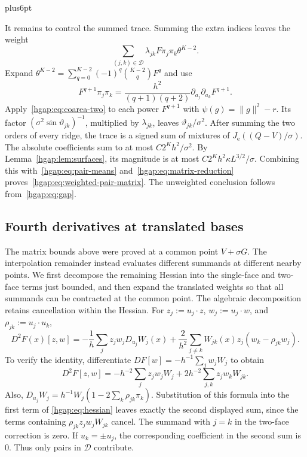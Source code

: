 \documentclass[11pt,letterpaper,twoside,leqno]{article}
\makeatletter
\theoremstyle{bookplain}
\theoremstyle{bookremark}
\renewenvironment{proof}[1][\proofname]{\par
  \pushQED{\qed}\normalfont\topsep6pt plus6pt\relax
  \trivlist\item[\hskip\labelsep\bfseries #1\@addpunct{.}]\ignorespaces
}{\popQED\endtrivlist\@endpefalse}
\newcommand{\cD}{\mathcal D}
\makeatother
\begin{document}
\begin{proof}
It remains to control the summed trace. Summing the extra indices
leaves the weight
\[
 \sum_{(j,k)\in\cD}\lambda_{jk}F\pi_j\pi_k\theta^{K-2}.
\]
Expand
$\theta^{K-2}=\sum_{q=0}^{K-2}(-1)^q\binom{K-2}{q}F^q$ and use
\[
 F^{q+1}\pi_j\pi_k
 =\frac{h^2}{(q+1)(q+2)}
       \partial_{a_j}\partial_{a_k}F^{q+1}.
\]
Apply~\eqref{hgap:eq:coarea-two} to each power $F^{q+1}$ with
$\psi(g)=\|g\|^2-r$. Its factor
$(\sigma^2\sin\vartheta_{jk})^{-1}$, multiplied by
$\lambda_{jk}$, leaves $\vartheta_{jk}/\sigma^2$.
After summing the two orders of every ridge, the trace is a signed
sum of mixtures of $J_{\mathrm e}((Q-V)/\sigma)$.
The absolute coefficients sum to at most $C2^Kh^2/\sigma^2$.
By Lemma~\ref{hgap:lem:surfaces}, its magnitude is at most
$C2^K h^2\kappa L^{3/2}/\sigma$. Combining this with~\eqref{hgap:eq:pair-means}
and~\eqref{hgap:eq:matrix-reduction} proves~\eqref{hgap:eq:weighted-pair-matrix}.
The unweighted conclusion follows from~\eqref{hgap:eq:gap}.
\end{proof}

\subsection{Fourth derivatives at translated bases}\label{hgap:sec:translated}

The matrix bounds above were proved at a common point $V+\sigma G$.
The interpolation remainder instead evaluates different summands at
different nearby points. We first decompose the remaining Hessian
into the single-face and two-face terms just bounded, and then expand
the translated weights so that all summands can be contracted at the
common point.
The algebraic decomposition retains cancellation within the Hessian.
For $z_j:=u_j\cdot z$, $w_j:=u_j\cdot w$, and
$\rho_{jk}:=u_j\cdot u_k$,
\begin{equation}
 D^2F(x)[z,w]
 =-\frac1h\sum_j z_jw_jD_{u_j}W_j(x)
 +\frac2{h^2}\sum_{j\ne k}W_{jk}(x)z_j(w_k-\rho_{jk}w_j).
 \label{hgap:eq:hessian}
\end{equation}
To verify the identity, differentiate $D F[w]=-h^{-1}\sum_jw_jW_j$
to obtain
\[
 D^2F[z,w]=-h^{-2}\sum_jz_jw_jW_j
                    +2h^{-2}\sum_{j,k}z_jw_kW_{jk}.
\]
Also,
$D_{u_j}W_j=h^{-1}W_j(1-2\sum_k\rho_{jk}\pi_k)$.
Substitution of this formula into the first term of
\eqref{hgap:eq:hessian} leaves exactly the second displayed sum,
since the terms containing $\rho_{jk}z_jw_jW_{jk}$ cancel.
The summand with $j=k$ in the two-face correction is zero.
If $u_k=\pm u_j$, the corresponding coefficient in the second sum is
$0$. Thus only pairs in $\cD$ contribute.
\end{document}
